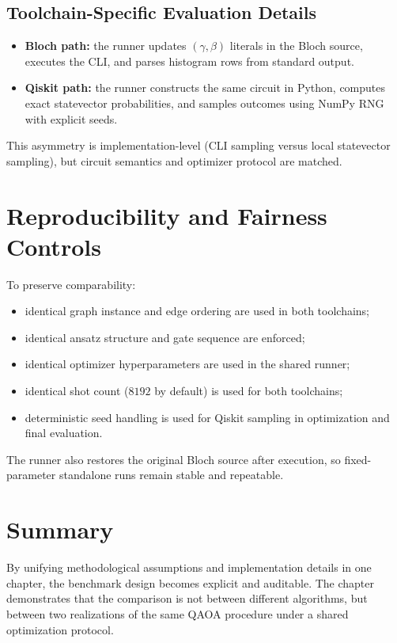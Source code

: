 \subsection{Toolchain-Specific Evaluation Details}

\begin{itemize}
    \item \textbf{Bloch path:} the runner updates \((\gamma,\beta)\) literals in the Bloch source, executes the CLI, and parses histogram rows from standard output.
    \item \textbf{Qiskit path:} the runner constructs the same circuit in Python, computes exact statevector probabilities, and samples outcomes using NumPy RNG with explicit seeds.
\end{itemize}

This asymmetry is implementation-level (CLI sampling versus local statevector sampling), but circuit semantics and optimizer protocol are matched.

\section{Reproducibility and Fairness Controls}
\label{sec:reproducibility_fairness}

To preserve comparability:
\begin{itemize}
    \item identical graph instance and edge ordering are used in both toolchains;
    \item identical ansatz structure and gate sequence are enforced;
    \item identical optimizer hyperparameters are used in the shared runner;
    \item identical shot count (\(8192\) by default) is used for both toolchains;
    \item deterministic seed handling is used for Qiskit sampling in optimization and final evaluation.
\end{itemize}

The runner also restores the original Bloch source after execution, so fixed-parameter standalone runs remain stable and repeatable.

\section{Summary}
\label{sec:method_impl_summary}

By unifying methodological assumptions and implementation details in one chapter, the benchmark design becomes explicit and auditable.
The chapter demonstrates that the comparison is not between different algorithms, but between two realizations of the same QAOA procedure under a shared optimization protocol.
